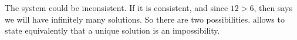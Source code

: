 The system could be inconsistent.  If it is consistent, and since $12>6$, then  says we will have infinitely many solutions.  So there are two possibilities.   allows to state equivalently that a unique solution is an impossibility.